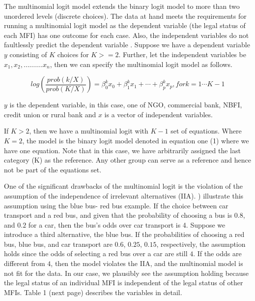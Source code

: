 \documentclass[a4paper,nobind]{templates/ociamthesis}
\begin{document}
The multinomial logit model extends the binary logit model to more than two unordered levels (discrete choices). The data at hand meets the requirements for running a multinomial logit model as the dependent variable (the legal status of each MFI) has one outcome for each case. Also, the independent variables do not faultlessly predict the dependent variable \autocite{petrucci2009primer}. Suppose we have a dependent variable \(y\) consisting of \(K\) choices for \(K>=2\). Further, let the independent variables be \(x_1, x_2,………. x_n\), then we can specify the multinomial logit model as follows.

\begin{equation}
log(\frac{prob(k/X)}{prob(K/X)}) =   \beta_{0}^{k}  x_{0}  + \beta_{1}^{k}  x_{1} +  \cdots + \beta_{p}^{k}  x_{p}, for k = 1 \cdots K-1
\end{equation}

\(y\) is the dependent variable, in this case, one of NGO, commercial bank, NBFI, credit union or rural bank and \(x\) is a vector of independent variables.

If \(K>2\), then we have a multinomial logit with \(K-1\) set of equations. Where \(K=2\), the model is the binary logit model denoted in equation one (1) where we have one equation. Note that in this case, we have arbitrarily assigned the last category (K) as the reference. Any other group can serve as a reference and hence not be part of the equations set.

One of the significant drawbacks of the multinomial logit is the violation of the assumption of the independence of irrelevant alternatives (IIA). \textcite{cheng2007testing} ) illustrate this assumption using the blue bus- red bus example. If the choice between car transport and a red bus, and given that the probability of choosing a bus is \(0.8\), and \(0.2\) for a car, then the bus's odds over car transport is 4. Suppose we introduce a third alternative, the blue bus. If the probabilities of choosing a red bus, blue bus, and car transport are \(0.6\), \(0.25\), \(0.15\), respectively, the assumption holds since the odds of selecting a red bus over a car are still \(4\). If the odds are different from \(4\), then the model violates the IIA, and the multinomial model is not fit for the data. In our case, we plausibly see the assumption holding because the legal status of an individual MFI is independent of the legal status of other MFIs. Table 1 (next page) describes the variables in detail.
\end{document}
